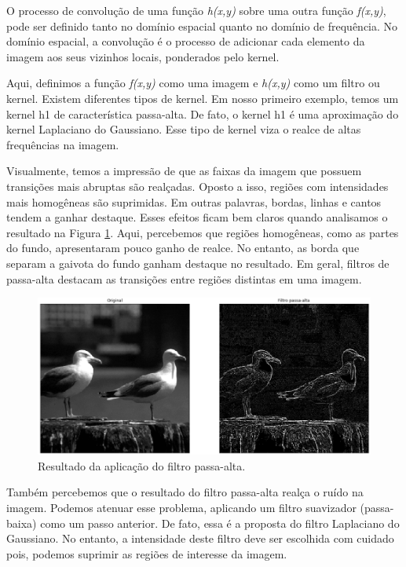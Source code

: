 \documentclass[10pt,twocolumn,letterpaper]{article}
\begin{document}
O processo de convolução de uma função \textit{h(x,y)} sobre uma outra função \textit{f(x,y)}, pode ser definido tanto no domínio espacial quanto no domínio de frequência. No domínio espacial, a convolução é o processo de adicionar cada elemento da imagem aos seus vizinhos locais, ponderados pelo kernel.

Aqui, definimos a função \textit{f(x,y)} como uma imagem e \textit{h(x,y)} como um filtro ou kernel. Existem diferentes tipos de kernel. Em nosso primeiro exemplo, temos um kernel h1 de característica passa-alta. De fato, o kernel h1 é uma aproximação do kernel Laplaciano do Gaussiano. Esse tipo de kernel viza o realce de altas frequências na imagem. 

Visualmente, temos a impressão de que as faixas da imagem que possuem transições mais abruptas são realçadas. Oposto a isso, regiões com intensidades mais homogêneas são suprimidas. Em outras palavras, bordas, linhas e cantos tendem a ganhar destaque. Esses efeitos ficam bem claros quando analisamos o resultado na Figura \ref{fig:filtro-passa-alta}. Aqui, percebemos que regiões homogêneas, como as partes do fundo, apresentaram pouco ganho de realce. No entanto, as borda que separam a gaivota do fundo ganham destaque no resultado. Em geral, filtros de passa-alta destacam as transições entre regiões distintas em uma imagem.

\begin{figure}
\begin{center}
	\includegraphics[width=0.99\columnwidth]{pics/high_pass_filter}
	\caption{Resultado da aplicação do filtro passa-alta.\label{fig:filtro-passa-alta}}   
\end{center} 
\end{figure}  

Também percebemos que o resultado do filtro passa-alta realça o ruído na imagem. Podemos atenuar esse problema, aplicando um filtro suavizador (passa-baixa) como um passo anterior. De fato, essa é a proposta do filtro Laplaciano do Gaussiano. No entanto, a intensidade deste filtro deve ser escolhida com cuidado pois, podemos suprimir as regiões de interesse da imagem.
\end{document}
